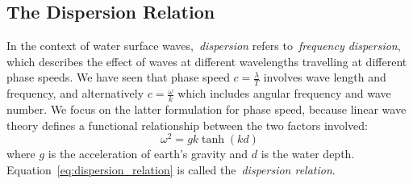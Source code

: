 \subsection{The Dispersion Relation}
\label{sec:dispersion_relation}

In the context of water surface waves,~\emph{dispersion} refers to~\emph{frequency dispersion}, which describes
the effect of waves at different wavelengths travelling at different phase speeds. We have seen that
phase speed $c = \frac{\lambda}{T}$ involves wave length and frequency, and alternatively $c = \frac{\omega}{k}$
which includes angular frequency and wave number. We focus on the latter formulation for phase speed, because
linear wave theory defines a functional relationship between the two factors involved:
\begin{equation}
\label{eq:dispersion_relation}
 \omega^2 = gk\tanh(kd)
\end{equation}
%
where $g$ is the acceleration of earth's gravity and $d$ is the water depth. Equation~\ref{eq:dispersion_relation}
is called the~\emph{dispersion relation}.\\

